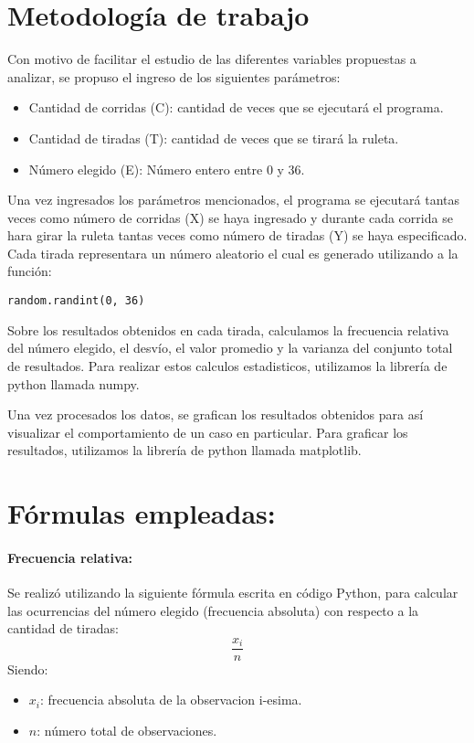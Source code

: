 \documentclass{article}
\begin{document}
\section{Metodología de trabajo}
Con motivo de facilitar el estudio de las diferentes variables propuestas a analizar, se propuso el ingreso de los siguientes parámetros:
\begin{itemize}
\item Cantidad de corridas (C): cantidad de veces que se ejecutará el programa.
\item Cantidad de tiradas (T): cantidad de veces que se tirará la ruleta.
\item Número elegido (E): Número entero entre 0 y 36.
\end{itemize}
Una vez ingresados los parámetros mencionados, el programa se ejecutará tantas veces como número de corridas (X) se haya ingresado y durante cada corrida se hara girar la ruleta tantas veces como número de tiradas (Y) se haya especificado. 
Cada tirada representara un número aleatorio el cual es generado utilizando a la función:
\begin{verbatim}random.randint(0, 36)\end{verbatim}

Sobre los resultados obtenidos en cada tirada, calculamos la frecuencia relativa del número elegido, el desvío, el valor promedio y la varianza del conjunto total de resultados. Para realizar estos calculos estadisticos, utilizamos la librería de python llamada numpy.

Una vez procesados los datos, se grafican los resultados obtenidos para así visualizar el comportamiento de un caso en particular. Para graficar los resultados, utilizamos la librería de python llamada matplotlib.

\section{Fórmulas empleadas:}

\paragraph{Frecuencia relativa:}Se realizó utilizando la siguiente fórmula escrita en código Python, para calcular las ocurrencias del número elegido (frecuencia absoluta) con respecto a la cantidad de tiradas: \begin{equation} \frac{{x}_i}{n} \end{equation}
Siendo:\begin{itemize}
\item $x_{i}$: frecuencia absoluta de la observacion i-esima.

\item $n$: número total de observaciones.
\end{itemize}
\end{document}
